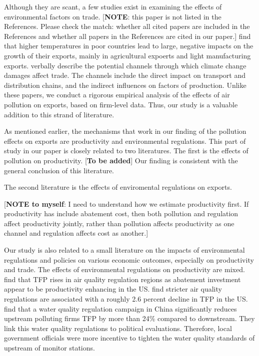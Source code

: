 \documentclass[12pt]{article}
\begin{document}
Although they are scant, a few studies exist in examining the effects of
environmental factors on trade. \cite{jones2010climate} [\textbf{NOTE}: this
paper is not listed in the References. Please check the match: whether all
cited papers are included in the References and whether all papers in the
References are cited in our paper.] find that higher temperatures in poor
countries lead to large, negative impacts on the growth of their exports,
mainly in agricultural expoerts and light manufacturing exports. \cite%
{dellink2017international} verbally describe the potential channels through
which climate change damages affect trade. The channels include the direct
impact on transport and distribution chains, and the indirect influences on
factors of production. Unlike these papers, we conduct a rigorous empirical
analysis of the effects of air pollution on exports, based on firm-level
data. Thus, our study is a valuable addition to this strand of literature.

As mentioned earlier, the mechanisms that work in our finding of the
pollution effects on exports are productivity and environmental regulations.
This part of study in our paper is closely related to two literatures. The
first is the effects of pollution on productivity. [\textbf{To be added}]
Our finding is consistent with the general conclusion of this literature.

The second literature is the effects of enviromental regulations on exports.

[\textbf{NOTE to myself}: I need to understand how we estimate productivity
first. If productivity has include abatement cost, then both pollution and
regulation affect productivity jointly, rather than pollution affects
productivity as one channel and regulation affects cost as another.]

Our study is also related to a small literature on the impacts of
environmental regulations and policies on various economic outcomes,
especially on productivity and trade. The effects of environmental
regulations on productivity are mixed. \cite{berman2001environmental} find
that TFP rises in air quality regulation regions as abatement investment
appear to be productivity enhancing in the US. \cite{greenstone2012effects}
find stricter air quality regulations are associated with a roughly 2.6
percent decline in TFP in the US. \cite{he2020watering} find that a water
quality regulation campaign in China significantly reduces upstream
polluting firms TFP by more than 24\% compared to downstream. They link this
water quality regulations to political evaluations. Therefore, local
government officials were more incentive to tighten the water quality
standards of upstream of monitor stations.
\end{document}
